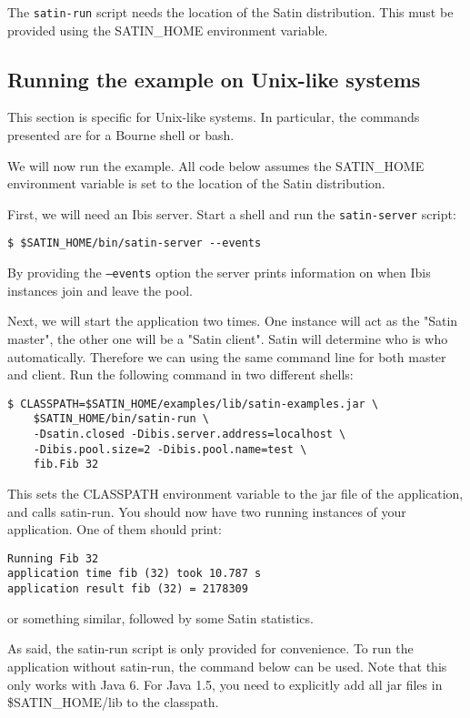 \documentclass[a4paper,10pt]{article}
\begin{document}
The \texttt{satin-run} script needs the location of the Satin
distribution. This must be provided using the SATIN\_HOME environment
variable.

\subsection{Running the example on Unix-like systems}

This section is specific for Unix-like systems. In particular, the
commands presented are for a Bourne shell or bash.

We will now run the example. All code below assumes the SATIN\_HOME
environment variable is set to the location of the Satin distribution.

First, we will need an Ibis server. Start a shell and
run the \texttt{satin-server} script:
\noindent
{\small
\begin{verbatim}
$ $SATIN_HOME/bin/satin-server --events
\end{verbatim}
}
\noindent

By providing the \texttt{--events} option the server
prints information on when Ibis instances join and leave the pool.

Next, we will start the application two times. One instance will act as the
"Satin master", the other one will be a "Satin client".
Satin will determine who is who automatically. Therefore we can using the same
command line for both master and client.
Run the following command in two different shells:

\noindent
{\small
\begin{verbatim}
$ CLASSPATH=$SATIN_HOME/examples/lib/satin-examples.jar \
    $SATIN_HOME/bin/satin-run \
    -Dsatin.closed -Dibis.server.address=localhost \
    -Dibis.pool.size=2 -Dibis.pool.name=test \
    fib.Fib 32
\end{verbatim}
}
\noindent

This sets the CLASSPATH environment variable to the jar file of the
application, and calls satin-run. You should now have two running
instances of your application. One of them should print:

\noindent
{\small
\begin{verbatim}
Running Fib 32
application time fib (32) took 10.787 s
application result fib (32) = 2178309
\end{verbatim}
}
\noindent

or something similar, followed by some Satin statistics.

As said, the satin-run script is only provided for convenience. To run
the application without satin-run, the command below can be used.
Note that this only works with Java 6. For Java 1.5, you need to
explicitly add all jar files in \$SATIN\_HOME/lib to the classpath.
\end{document}
